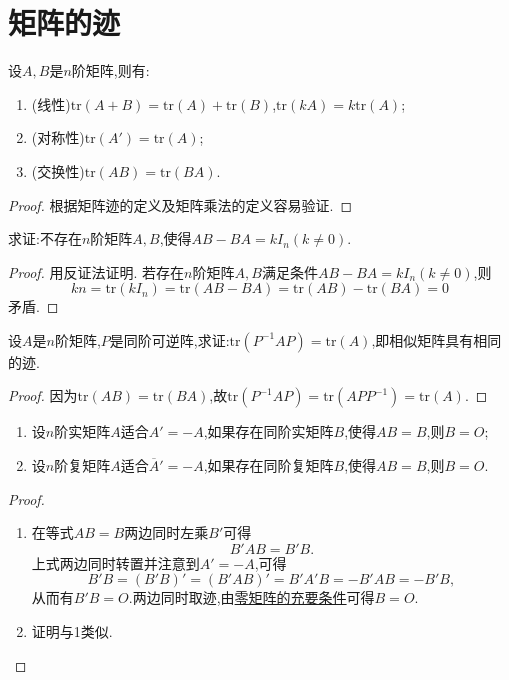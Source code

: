 \documentclass[../../main.tex]{subfiles}
\begin{document}
\section{矩阵的迹}

\begin{proposition}[矩阵迹的性质]\label{proposition:矩阵矩阵迹的性质}
设\(A,B\)是\(n\)阶矩阵,则有:
\begin{enumerate}
\item (线性)\(\mathrm{tr}(A + B)=\mathrm{tr}(A)+\mathrm{tr}(B)\),\(\mathrm{tr}(kA)=k\mathrm{tr}(A)\);
\item (对称性)\(\mathrm{tr}(A')=\mathrm{tr}(A)\);
\item (交换性)\(\mathrm{tr}(AB)=\mathrm{tr}(BA)\).
\end{enumerate}
\end{proposition}
\begin{proof}
根据矩阵迹的定义及矩阵乘法的定义容易验证.

\end{proof}

\begin{example}
求证:不存在\(n\)阶矩阵\(A,B\),使得\(AB - BA = kI_n(k\neq0)\).
\end{example}
\begin{proof}
用反证法证明. 若存在\(n\)阶矩阵\(A,B\)满足条件\(AB - BA = kI_n(k\neq0)\),则
\[
kn=\mathrm{tr}(kI_n)=\mathrm{tr}(AB - BA)=\mathrm{tr}(AB)-\mathrm{tr}(BA)=0
\]
矛盾.

\end{proof}

\begin{proposition}
设\(A\)是\(n\)阶矩阵,\(P\)是同阶可逆阵,求证:\(\mathrm{tr}(P^{-1}AP)=\mathrm{tr}(A)\),即相似矩阵具有相同的迹.
\end{proposition}
\begin{proof}
因为\(\mathrm{tr}(AB)=\mathrm{tr}(BA)\),故\(\mathrm{tr}(P^{-1}AP)=\mathrm{tr}(APP^{-1})=\mathrm{tr}(A)\).

\end{proof}

\begin{proposition}\label{proposition:反称/反酉矩阵为零矩阵的充要条件}
\begin{enumerate}
\item 设\(n\)阶实矩阵\(A\)适合\(A'=-A\),如果存在同阶实矩阵\(B\),使得\(AB = B\),则\(B = O\);
\item 设\(n\)阶复矩阵\(A\)适合\(\overline{A}'=-A\),如果存在同阶复矩阵\(B\),使得\(AB = B\),则\(B = O\).
\end{enumerate}
\end{proposition}
\begin{proof}
\begin{enumerate}
\item 在等式\(AB = B\)两边同时左乘\(B'\)可得
\[
B'AB = B'B.
\]
上式两边同时转置并注意到\(A'=-A\),可得
\[
B'B=(B'B)'=(B'AB)'=B'A'B=-B'AB=-B'B,
\]
从而有\(B'B = O\).两边同时取迹,由\hyperref[proposition:零矩阵的充要条件]{零矩阵的充要条件}可得\(B = O\).
\item 证明与1类似.
\end{enumerate}

\end{proof}
\end{document}
